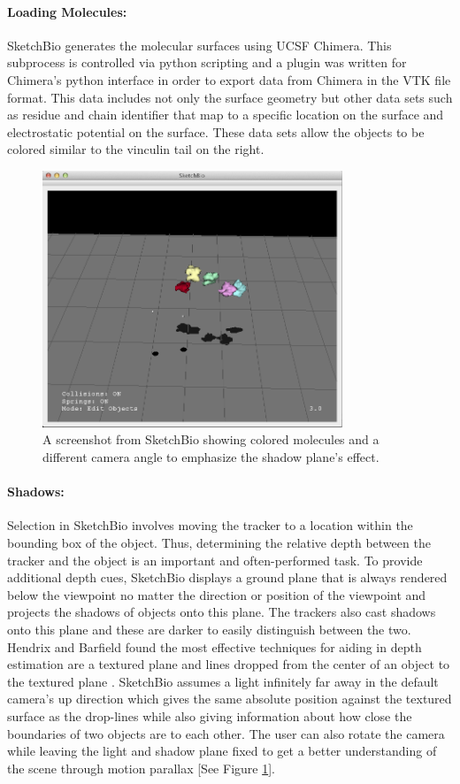 \documentclass{article} %
\begin{document}
\paragraph{Loading Molecules:}
SketchBio generates the molecular surfaces using UCSF Chimera\cite{pettersen2004ucsf}.  This subprocess is controlled via python scripting and a plugin was written for Chimera's python interface in order to export data from Chimera in the VTK file format.  This data includes not only the surface geometry but other data sets such as residue and chain identifier that map to a specific location on the surface and electrostatic potential on the surface.  These data sets allow the objects to be colored similar to the vinculin tail on the right.

\begin{figure}[h]
\centering
\includegraphics[width=0.8\textwidth]{shadow_plane.png}
\caption{A screenshot from SketchBio showing colored molecules and a different camera angle to emphasize the shadow plane's effect.}
\label{fig:shadow_plane}
\end{figure}
\paragraph{Shadows:}
Selection in SketchBio involves moving the tracker to a location within the bounding box of the object.  Thus, determining the relative depth between the tracker and the object is an important and often-performed task.  To provide additional depth cues, SketchBio displays a ground plane that is always rendered below the viewpoint no matter the direction or position of the viewpoint and projects the shadows of objects onto this plane.  The trackers also cast shadows onto this plane and these are darker to easily distinguish between the two.  Hendrix and Barfield found the most effective techniques for aiding in depth estimation are a textured plane and lines dropped from the center of an object to the textured plane \cite{Hendrix1995103}.  SketchBio assumes a light infinitely far away in the default camera's up direction which gives the same absolute position against the textured surface as the drop-lines while also giving information about how close the boundaries of two objects are to each other.  The user can also rotate the camera while leaving the light and shadow plane fixed to get a better understanding of the scene through motion parallax [See Figure \ref{fig:shadow_plane}].
\end{document}
